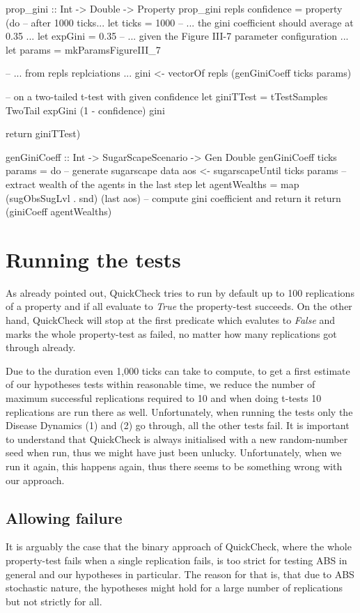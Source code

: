 \begin{HaskellCode}
prop_gini :: Int -> Double -> Property
prop_gini repls confidence = property (do
  -- after 1000 ticks...
  let ticks = 1000
  -- ... the gini coefficient should average at 0.35 ...
  let expGini = 0.35
  -- ... given the Figure III-7 parameter configuration ...
  let params = mkParamsFigureIII_7
  
  -- ... from repls replciations ... 
  gini <- vectorOf repls (genGiniCoeff ticks params)

  -- on a two-tailed t-test with given confidence
  let giniTTest = tTestSamples TwoTail expGini (1 - confidence) gini

  return giniTTest)
  
genGiniCoeff :: Int -> SugarScapeScenario -> Gen Double
genGiniCoeff ticks params = do
  -- generate sugarscape data
  aos <- sugarscapeUntil ticks params
  -- extract wealth of the agents in the last step
  let agentWealths = map (sugObsSugLvl . snd) (last aos)
  -- compute gini coefficient and return it
  return (giniCoeff agentWealths)
\end{HaskellCode}

\section{Running the tests}
As already pointed out, QuickCheck tries to run by default up to 100 replications  of a property and if all evaluate to \textit{True} the property-test succeeds. On the other hand, QuickCheck will stop at the first predicate which evalutes to \textit{False} and marks the whole property-test as failed, no matter how many replications got through already. 

Due to the duration even 1,000 ticks can take to compute, to get a first estimate of our hypotheses tests within reasonable time, we reduce the number of maximum successful replications required to 10 and when doing t-tests 10 replications are run there as well. Unfortunately, when running the tests only the Disease Dynamics (1) and (2) go through, all the other tests fail. It is important to understand that QuickCheck is always initialised with a new random-number seed when run, thus we might have just been unlucky. Unfortunately, when we run it again, this happens again, thus there seems to be something wrong with our approach.

\subsection{Allowing failure}
It is arguably the case that the binary approach of QuickCheck, where the whole property-test fails when a single replication fails, is too strict for testing ABS in general and our hypotheses in particular. The reason for that is, that due to ABS stochastic nature, the hypotheses might hold for a large number of replications but not strictly for all.

